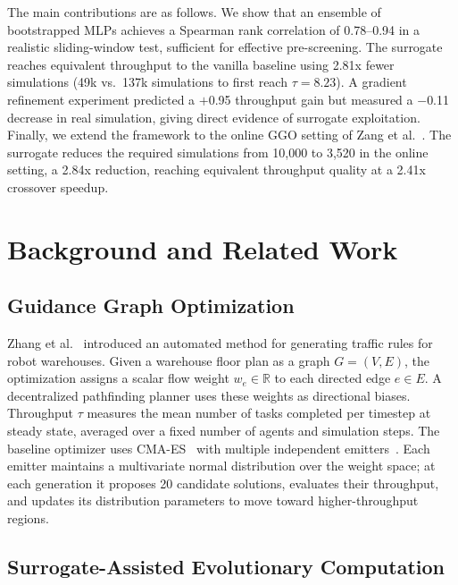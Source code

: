 \documentclass[conference]{IEEEtran}
\begin{document}
The main contributions are as follows. We show that an ensemble of
bootstrapped MLPs achieves a Spearman rank correlation of 0.78--0.94 in a
realistic sliding-window test, sufficient for effective pre-screening.
The surrogate reaches equivalent throughput to the vanilla baseline
using 2.81x fewer simulations (49k vs.\ 137k simulations to first reach
$\tau = 8.23$). A gradient
refinement experiment predicted a $+$0.95 throughput gain but measured a
$-$0.11 decrease in real simulation, giving direct evidence of surrogate
exploitation. Finally, we extend the framework to the online GGO setting
of Zang et al.~\cite{zang2025}. The surrogate reduces the required
simulations from 10,000 to 3,520 in the online setting, a 2.84x
reduction, reaching equivalent throughput quality at a 2.41x crossover
speedup.



\section{Background and Related Work}

\subsection{Guidance Graph Optimization}

Zhang et al.~\cite{zhang2024} introduced an automated method for
generating traffic rules for robot warehouses. Given a warehouse floor plan
as a graph $G = (V, E)$, the optimization assigns a scalar flow weight
$w_e \in \mathbb{R}$ to each directed edge $e \in E$. A decentralized
pathfinding planner uses these weights as directional biases. Throughput
$\tau$ measures the mean number of tasks completed per timestep at steady
state, averaged over a fixed number of agents and simulation steps. The
baseline optimizer uses CMA-ES~\cite{hansen2016} with multiple
independent emitters~\cite{fontaine2020}. Each emitter maintains a
multivariate normal distribution over the weight space; at each generation
it proposes 20 candidate solutions, evaluates their throughput, and
updates its distribution parameters to move toward higher-throughput
regions.

\subsection{Surrogate-Assisted Evolutionary Computation}
\end{document}
